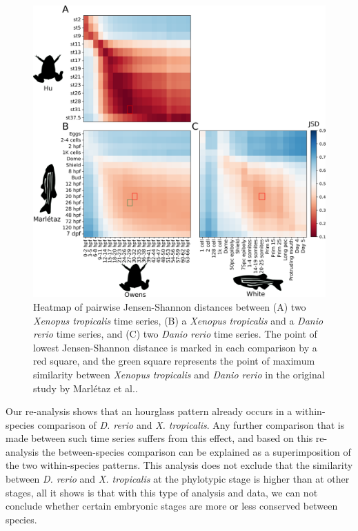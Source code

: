 \begin{figure}[H]
    \includegraphics[width=\linewidth]{ch4.hourglass/images/between_experiment.png}
    \caption{Heatmap of pairwise Jensen-Shannon distances between (A) two \textit{Xenopus tropicalis} time series, (B) a \textit{Xenopus tropicalis} and a \textit{Danio rerio} time series, and (C) two \textit{Danio rerio} time series. The point of lowest Jensen-Shannon distance is marked in each comparison by a red square, and the green square represents the point of maximum similarity between \textit{Xenopus tropicalis} and \textit{Danio rerio} in the original study by Marl\'etaz et al.\cite{marletaz2018}.}
    \label{fig:betweenexperiment}
\end{figure}

Our re-analysis shows that an hourglass pattern already occurs in a within-species comparison of \textit{D. rerio} and \textit{X. tropicalis}. Any further comparison that is made between such time series suffers from this effect, and based on this re-analysis the between-species comparison can be explained as a superimposition of the two within-species patterns. This analysis does not exclude that the similarity between \textit{D. rerio} and \textit{X. tropicalis} at the phylotypic stage is higher than at other stages, all it shows is that with this type of analysis and data, we can not conclude whether certain embryonic stages are more or less conserved between species.

